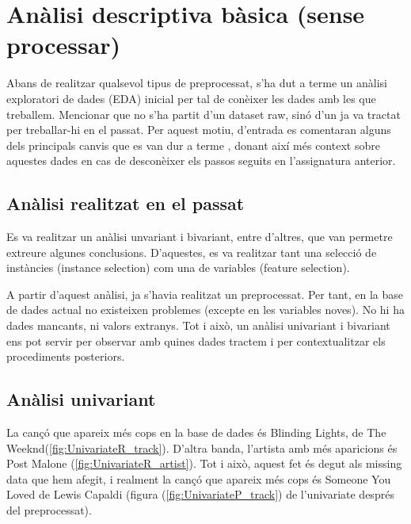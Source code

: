 \section{Anàlisi descriptiva bàsica (sense processar)}
Abans de realitzar qualsevol tipus de preprocessat, s’ha dut a terme un anàlisi exploratori de dades (EDA) inicial per tal de conèixer les dades amb les que treballem. Mencionar que no s’ha partit d’un dataset raw, sinó d’un ja va tractat per treballar-hi en el passat. Per aquest motiu, d’entrada es comentaran alguns dels principals canvis que es van dur a terme , donant així més context sobre aquestes dades en cas de desconèixer els passos seguits en l’assignatura anterior.

\subsection{Anàlisi realitzat en el passat}
Es va realitzar un anàlisi unvariant i bivariant, entre d'altres, que van permetre extreure algunes conclusions. D'aquestes, es va realitzar tant una selecció de instàncies (instance selection) com una de variables (feature selection). 

A partir d'aquest anàlisi, ja s'havia realitzat un preprocessat. Per tant, en la base de dades actual no existeixen problemes (excepte en les variables noves). No hi ha dades mancants, ni valors extranys. Tot i això, un anàlisi univariant i bivariant ens pot servir per observar amb quines dades tractem i per contextualitzar els procediments posteriors.

\subsection{Anàlisi univariant}

La cançó que apareix més cops en la base de dades és Blinding Lights, de The Weeknd(\ref{fig:UnivariateR_track}). D'altra banda, l'artista amb més aparicions és Post Malone (\ref{fig:UnivariateR_artist}). Tot i això, aquest fet és degut als missing data que hem afegit, i realment la cançó que apareix més cops és Someone You Loved de Lewis Capaldi (figura (\ref{fig:UnivariateP_track}) de l'univariate després del preprocessat).

